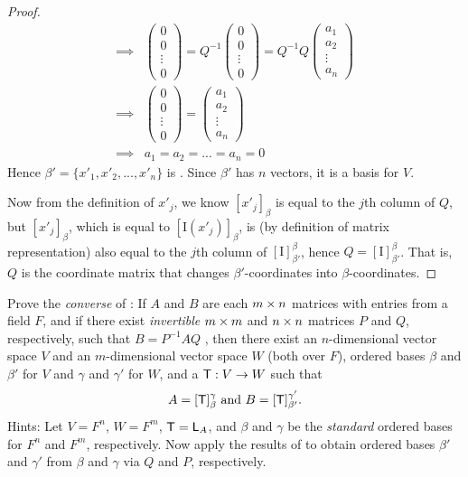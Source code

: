 \begin{proof}
\begin{align*}
    \implies & \begin{pmatrix} 0 \\ 0 \\ \vdots \\ 0 \end{pmatrix} = Q^{-1} \begin{pmatrix} 0 \\ 0 \\ \vdots \\ 0 \end{pmatrix}
    = Q^{-1} Q \begin{pmatrix} a_1 \\ a_2 \\ \vdots \\ a_n \end{pmatrix} \\
    \implies & \begin{pmatrix} 0 \\ 0 \\ \vdots \\ 0 \end{pmatrix}
    = \begin{pmatrix} a_1 \\ a_2 \\ \vdots \\ a_n \end{pmatrix} \\
    \implies & a_1 = a_2 = ... = a_n = 0
\end{align*}
Hence \(\beta' = \{ x'_1, x'_2, ..., x'_n \}\) is \LID{}.
Since \(\beta'\) has \(n\) vectors, it is a basis for \(V\).

Now from the definition of \(x'_j\), we know \([x'_j]_{\beta}\) is equal to the \(j\)th column of \(Q\), but \([x'_j]_{\beta}\), which is equal to \([\mathrm{I}(x'_j)]_{\beta}\),
is (by definition of matrix representation) also equal to the \(j\)th column of \([\mathrm{I}]_{\beta'}^{\beta}\), hence \(Q = [\mathrm{I}]_{\beta'}^{\beta}\).
That is, \(Q\) is the coordinate matrix that changes \(\beta'\)-coordinates into \(\beta\)-coordinates.
\end{proof}

\begin{exercise} \label{exercise 2.5.14}
Prove the \emph{converse} of :
If \(A\) and \(B\) are each \(m \times n\) matrices with entries from a field \(F\), and if there exist \emph{invertible} \(m \times m\) and \(n \times n\) matrices \(P\) and \(Q\), respectively,
such that \(B = P^{-1} A Q\) , then there exist an \(n\)-dimensional vector space \(V\) and an \(m\)-dimensional vector space \(W\) (both over \(F\)), ordered bases \(\beta\) and \(\beta'\) for \(V\) and \(\gamma\) and \(\gamma'\) for \(W\),
and a \LTRAN{} \(\textsf{T} : V \to W\) such that
\[
    A = [\textsf{T}]_{\beta}^{\gamma} \text{ and } B = [\textsf{T}]_{\beta'}^{\gamma'}.
\]
Hints: Let \(V = F^n\), \(W = F^m\), \(\textsf{T} = \textsf{L}_A\), and \(\beta\) and \(\gamma\) be the \emph{standard} ordered bases for \(F^n\) and \(F^m\), respectively.
Now apply the results of  to obtain ordered bases \(\beta'\) and \(\gamma'\) from \(\beta\) and \(\gamma\) via \(Q\) and \(P\), respectively.
\end{exercise}

